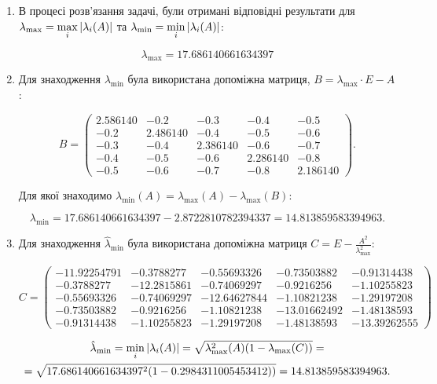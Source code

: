 \begin{enumerate}

	\item В процесі розв'язання задачі, були отримані відповідні результати для $\lambda_{\max} = \displaystyle\max\limits_i |\lambda_i(A)|$ та $\lambda_{\min} = \displaystyle\min\limits_i |\lambda_i(A)|$:

		\[\lambda_{\max} = 17.686140661634397 \]

	\item Для знаходження $\lambda_{\min}$ була використана допоміжна матриця, $B = \lambda_{\max} \cdot E - A$:

	\[ B = \begin{pmatrix} 2.586140 & -0.2 & -0.3 & -0.4 & -0.5 \\ -0.2 & 2.486140 & -0.4 & -0.5 & -0.6 \\ -0.3 & -0.4 & 2.386140 & -0.6 & -0.7 \\ -0.4 & -0.5 & -0.6 & 2.286140 & -0.8 \\ -0.5 & -0.6 & -0.7 & -0.8 & 2.186140 \end{pmatrix}. \]

	Для якої знаходимо $\lambda_{\min}(A) = \lambda_{\max}(A) - \lambda_{\max}(B)$:

		\[\lambda_{\min} = 17.686140661634397 - 2.8722810782394337 = 14.813859583394963. \]

	\item Для знаходження $\hat \lambda_{\min}$ була використана допоміжна матриця $C = E - \frac{A^2}{\lambda_{\max}^2	}$:

	\[ C = \begin{pmatrix} -11.92254791 & -0.3788277 & -0.55693326 & -0.73503882 & -0.91314438 \\ -0.3788277 & -12.2815861 & -0.74069297 & -0.9216256 & -1.10255823 \\ -0.55693326 & -0.74069297 & -12.64627844 & -1.10821238 & -1.29197208 \\ -0.73503882 & -0.9216256 & -1.10821238 & -13.01662492 & -1.48138593 \\ -0.91314438 & -1.10255823 & -1.29197208 & -1.48138593 & -13.39262555 \end{pmatrix}\]	

	\begin{multline*}\hat \lambda_{\min} = \displaystyle\min\limits_i |\lambda_i(A)| = \sqrt{\lambda_{\max}^2(A)(1-\lambda_{\max}(C))} = \\ =\sqrt{17.686140661634397^2(1-0.2984311005453412))}= 14.813859583394963. \end{multline*}

\end{enumerate}


